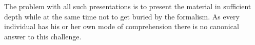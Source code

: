 {The problem}
with all such presentations is to present the material in sufficient depth while at the same time not to get buried by the formalism.
As every individual has his or her own mode of comprehension there is no canonical answer to this challenge.


